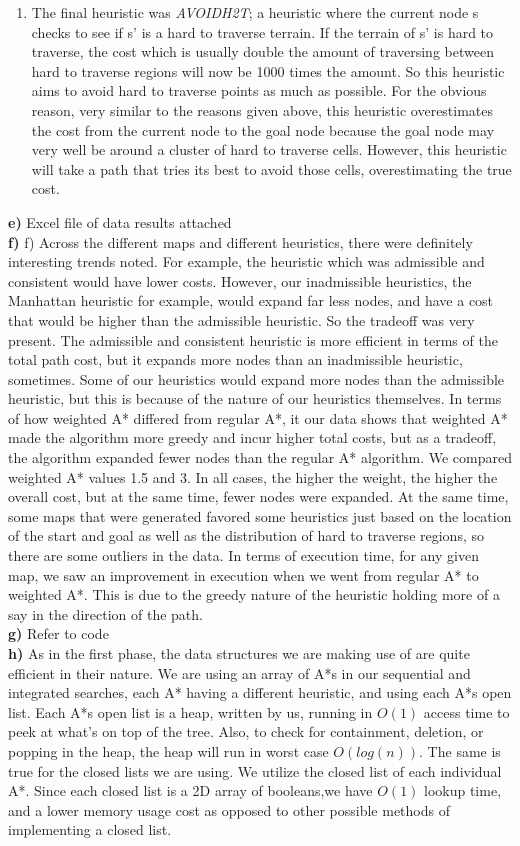 \documentclass[11pt]{article}
\begin{document}
\begin{enumerate}
\item The final heuristic was \textit{AVOIDH2T}; a heuristic where the current node s checks to see if s' is a hard to traverse terrain. If the terrain of s' is hard to traverse, the cost which is usually double the amount of traversing between hard to traverse regions will now be 1000 times the amount. So this heuristic aims to avoid hard to traverse points as much as possible. For the obvious reason, very similar to the reasons given above, this heuristic overestimates the cost from the current node to the goal node because the goal node may very well be around a cluster of hard to traverse cells. However, this heuristic will take a path that tries its best to avoid those cells, overestimating the true cost.
\end{enumerate} 
\textbf{e)} Excel file of data results attached
\\
\textbf{f)} f)	Across the different maps and different heuristics, there were definitely interesting trends noted. For example, the heuristic which was admissible and consistent would have lower costs. However, our inadmissible heuristics, the Manhattan heuristic for example, would expand far less nodes, and have a cost that would be higher than the admissible heuristic. So the tradeoff was very present. The admissible and consistent heuristic is more efficient in terms of the total path cost, but it expands more nodes than an inadmissible heuristic, sometimes. Some of our heuristics would expand more nodes than the admissible heuristic, but this is because of the nature of our heuristics themselves. In terms of how weighted A* differed from regular A*, it our data shows that weighted A* made the algorithm more greedy and incur higher total costs, but as a tradeoff, the algorithm expanded fewer nodes than the regular A* algorithm. We compared weighted A* values 1.5 and 3. In all cases, the higher the weight, the higher the overall cost, but at the same time, fewer nodes were expanded. At the same time, some maps that were generated favored some heuristics just based on the location of the start and goal as well as the distribution of hard to traverse regions, so there are some outliers in the data. In terms of execution time, for any given map, we saw an improvement in execution when we went from regular A* to weighted A*. This is due to the greedy nature of the heuristic holding more of a say in the direction of the path.
\\
\textbf{g)} Refer to code
\\
\textbf{h)} As in the first phase, the data structures we are making use of are quite efficient in their nature. We are using an array of A*s in our sequential and integrated searches, each A* having a different heuristic, and using each A*s open list. Each A*s open list is a heap, written by us, running in $O(1)$ access time to peek at what's on top of the tree. Also, to check for containment, deletion, or popping in the heap, the heap will run in worst case $O(log(n))$. The same is true for the closed lists we are using. We utilize the closed list of each individual A*. Since each closed list is a 2D array of booleans,we have $O(1)$ lookup time, and a lower memory usage cost as opposed to other possible methods of implementing a closed list. 
\end{document}
